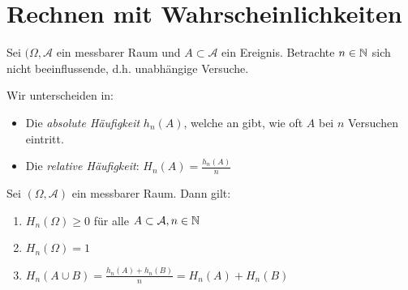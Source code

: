 \section{Rechnen mit Wahrscheinlichkeiten}
Sei $(\Omega, \mathcal{A}$ ein messbarer Raum und $A \subset \mathcal{A}$ ein Ereignis. Betrachte $n \in \mathbb{N}$  sich nicht beeinflussende, d.h. unabhängige Versuche.

\begin{definition}[Häufigkeiten]
	Wir unterscheiden in:
	\begin{itemize}
		\item Die \emph{absolute Häufigkeit} $h_n(A)$, welche an gibt, wie oft $A$ bei $n$ Versuchen eintritt.
		\item Die \emph{relative Häufigkeit}: $H_n(A) = \frac{h_n(A)}{n}$
	\end{itemize}
\end{definition}
\begin{theorem}
	Sei $(\Omega, \mathcal{A})$ ein messbarer Raum. Dann gilt:
	\begin{enumerate}
		\item $H_n(\Omega) \ge 0$ für alle $A \subset \mathcal{A}, n \in \mathbb{N}$
		\item $H_n(\Omega)=1$
		\item $H_n(A \cup B) = \frac{h_n(A)+h_n(B)}{n}= H_n(A)+H_n(B)$ 
	\end{enumerate}

\end{theorem}

